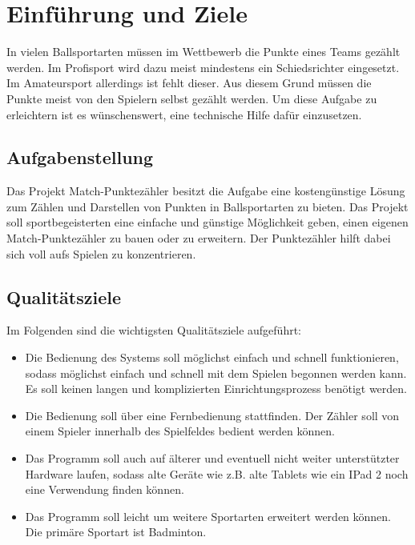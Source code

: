 \chapter{Einführung und Ziele}
In vielen Ballsportarten müssen im Wettbewerb die Punkte eines Teams gezählt werden. Im Profisport wird dazu meist mindestens ein Schiedsrichter eingesetzt. Im Amateursport allerdings ist fehlt dieser. Aus diesem Grund müssen die Punkte meist von den Spielern selbst gezählt werden. Um diese Aufgabe zu erleichtern ist es wünschenswert, eine technische Hilfe dafür einzusetzen. 
\section{Aufgabenstellung}
Das Projekt Match-Punktezähler besitzt die Aufgabe eine kostengünstige Lösung zum Zählen und Darstellen von Punkten in Ballsportarten zu bieten. Das Projekt soll sportbegeisterten eine einfache und günstige Möglichkeit geben, einen eigenen Match-Punktezähler zu bauen oder zu erweitern. Der Punktezähler hilft dabei sich voll aufs Spielen zu konzentrieren.  
\section{Qualitätsziele}
Im Folgenden sind die wichtigsten Qualitätsziele aufgeführt:\\
\begin{itemize}
	\item Die Bedienung des Systems soll möglichst einfach und schnell funktionieren, sodass möglichst einfach und schnell mit dem Spielen begonnen werden kann. Es soll keinen langen und komplizierten Einrichtungsprozess benötigt werden. 
	\item Die Bedienung soll über eine Fernbedienung stattfinden. Der Zähler soll von einem Spieler innerhalb des Spielfeldes bedient werden können. 
	\item Das Programm soll auch auf älterer und eventuell nicht weiter unterstützter Hardware laufen, sodass alte Geräte wie z.B. alte Tablets wie ein IPad 2 noch eine Verwendung finden können.
	\item Das Programm soll leicht um weitere Sportarten erweitert werden können. Die primäre Sportart ist Badminton. 
\end{itemize}
